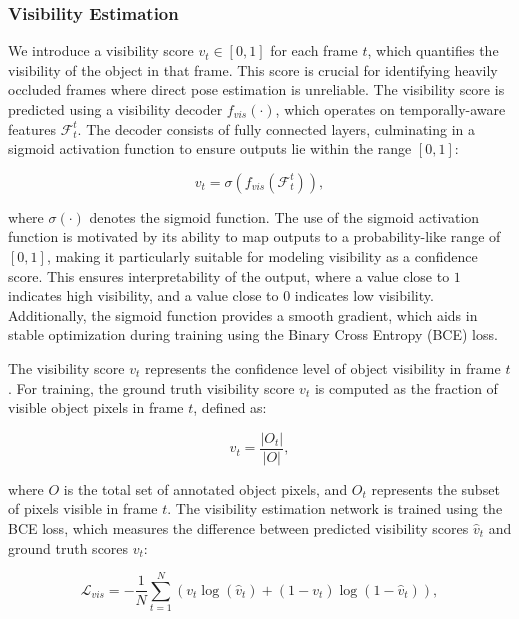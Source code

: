 \subsubsection{Visibility Estimation}

We introduce a visibility score $v_t \in [0, 1]$ for each frame $t$, which quantifies the visibility of the object in that frame. This score is crucial for identifying heavily occluded frames where direct pose estimation is unreliable. The visibility score is predicted using a visibility decoder $f_{vis}(\cdot)$, which operates on temporally-aware features $\mathcal{F}^t_t$. The decoder consists of fully connected layers, culminating in a sigmoid activation function to ensure outputs lie within the range $[0, 1]$:

\begin{equation}
v_t = \sigma(f_{vis}(\mathcal{F}^t_t)),
\end{equation}

\noindent where $\sigma(\cdot)$ denotes the sigmoid function. The use of the sigmoid activation function is motivated by its ability to map outputs to a probability-like range of $[0, 1]$, making it particularly suitable for modeling visibility as a confidence score. This ensures interpretability of the output, where a value close to $1$ indicates high visibility, and a value close to $0$ indicates low visibility. Additionally, the sigmoid function provides a smooth gradient, which aids in stable optimization during training using the Binary Cross Entropy (BCE) loss.

The visibility score $v_t$ represents the confidence level of object visibility in frame $t$. For training, the ground truth visibility score $v_t$ is computed as the fraction of visible object pixels in frame $t$, defined as:

\begin{equation}
v_t = \frac{|O_t|}{|O|},
\end{equation}

\noindent where $O$ is the total set of annotated object pixels, and $O_t$ represents the subset of pixels visible in frame $t$. The visibility estimation network is trained using the BCE loss, which measures the difference between predicted visibility scores $\hat{v}_t$ and ground truth scores $v_t$:

\begin{equation}
\mathcal{L}_{vis} = - \frac{1}{N} \sum_{t=1}^{N} \left( v_t \log(\hat{v}_t) + (1 - v_t) \log(1 - \hat{v}_t) \right),
\end{equation}

